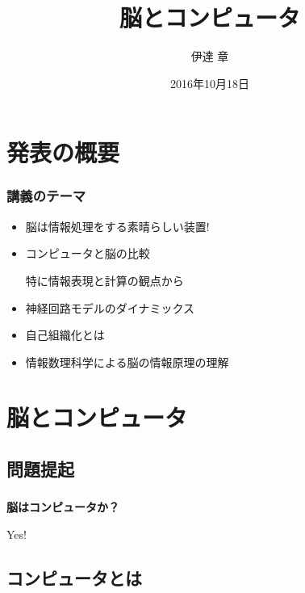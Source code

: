 \documentclass[14pt,dvipdfmx]{beamer}
\title{脳とコンピュータ}
\author{伊達 章}
\institute{宮崎大学}
\date{2016年10月18日}
\begin{document}
\frame{\titlepage}

\section{発表の概要}

\begin{frame}[c]

  \frametitle{講義のテーマ}
  
  \begin{itemize}
  \item<1-> 脳は情報処理をする素晴らしい装置{\color{red}!}
  \item<2-> コンピュータと脳の比較

特に情報表現と計算の観点から

  \item<3-> 神経回路モデルのダイナミックス
  \item<4-> 自己組織化とは
  \item<5-> 情報数理科学による{\color{blue}脳の情報原理}の理解
  \end{itemize}

\end{frame}

\section{脳とコンピュータ}
\subsection{問題提起}

\begin{frame}
  \frametitle{}
  \begin{center}\large\bfseries
   脳はコンピュータか？

\pause

   \Huge  \color{red}Yes!
  \end{center}
\end{frame}


\subsection{コンピュータとは}
\end{document}
